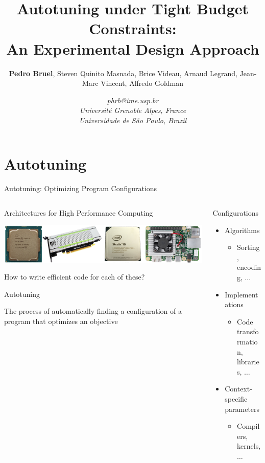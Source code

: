 \documentclass[10pt, compress, aspectratio=169, xcolor={table,usenames,dvipsnames}]{beamer}
\author{ \footnotesize \textbf{\alert{Pedro Bruel}},  Steven Quinito Masnada, Brice Videau, Arnaud Legrand, Jean-Marc Vincent, Alfredo Goldman}
\date{ \scriptsize \textit{phrb@ime.usp.br} \\[1em] \textit{Université Grenoble Alpes, France} \\ \textit{Universidade de São Paulo, Brazil}}
\title{Autotuning under Tight Budget Constraints:  \\ An Experimental Design Approach}
\begin{document}
\maketitle

\section{Autotuning}
\label{sec:org1450870}
\begin{frame}[label={sec:orgc2cc140}]{Autotuning: Optimizing Program Configurations}
\begin{columns}
\begin{column}{0.5\columnwidth}
\begin{block}{Architectures for High Performance Computing}
\begin{center}
\includegraphics[width=\columnwidth]{../../../img/architectures_2.png}
\end{center}

How to write \alert{efficient code} for each of these?

\begin{block}{Autotuning}
\vspace{.2cm}

The process of automatically finding a \mbox{\alert{configuration}} of a program
that optimizes an \mbox{\alert{objective}}
\end{block}
\end{block}
\end{column}

\begin{column}{0.5\columnwidth}
\begin{block}{Configurations}
\begin{itemize}
\item Algorithms
\begin{itemize}
\item Sorting, encoding, \(\dots\)
\end{itemize}
\item Implementations
\begin{itemize}
\item Code transformation, libraries, \(\dots\)
\end{itemize}
\item Context-specific parameters
\begin{itemize}
\item Compilers, kernels, \(\dots\)
\end{itemize}
\end{itemize}


\end{block}
\end{column}
\end{columns}
\end{frame}
\end{document}
